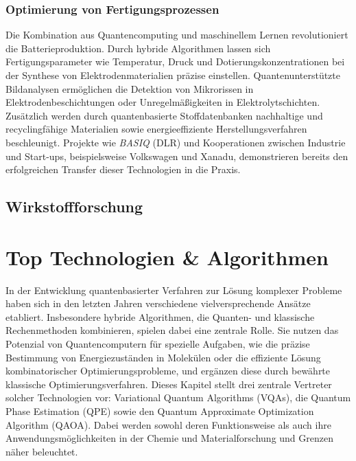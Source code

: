 \subsubsection*{Optimierung von Fertigungsprozessen}

Die Kombination aus Quantencomputing und maschinellem Lernen revolutioniert die Batterieproduktion. Durch hybride Algorithmen lassen sich Fertigungsparameter wie Temperatur, Druck und Dotierungskonzentrationen bei der Synthese von Elektrodenmaterialien präzise einstellen. Quantenunterstützte Bildanalysen ermöglichen die Detektion von Mikrorissen in Elektrodenbeschichtungen oder Unregelmäßigkeiten in Elektrolytschichten. Zusätzlich werden durch quantenbasierte Stoffdatenbanken nachhaltige und recyclingfähige Materialien sowie energieeffiziente Herstellungsverfahren beschleunigt. Projekte wie \textit{BASIQ} (DLR) und Kooperationen zwischen Industrie und Start-ups, beispielsweise Volkswagen und Xanadu, demonstrieren bereits den erfolgreichen Transfer dieser Technologien in die Praxis.

\subsection{Wirkstoffforschung}

\section{Top Technologien \& Algorithmen}
In der Entwicklung quantenbasierter Verfahren zur Lösung komplexer Probleme haben sich in den letzten Jahren verschiedene vielversprechende Ansätze etabliert. Insbesondere hybride Algorithmen, die Quanten- und klassische Rechenmethoden kombinieren, spielen dabei eine zentrale Rolle. Sie nutzen das Potenzial von Quantencomputern für spezielle Aufgaben, wie die präzise Bestimmung von Energiezuständen in Molekülen oder die effiziente Lösung kombinatorischer Optimierungsprobleme, und ergänzen diese durch bewährte klassische Optimierungsverfahren.
Dieses Kapitel stellt drei zentrale Vertreter solcher Technologien vor: Variational Quantum Algorithms (VQAs), die Quantum Phase Estimation (QPE) sowie den Quantum Approximate Optimization Algorithm (QAOA). Dabei werden sowohl deren Funktionsweise als auch ihre Anwendungsmöglichkeiten in der Chemie und Materialforschung und Grenzen näher beleuchtet.




